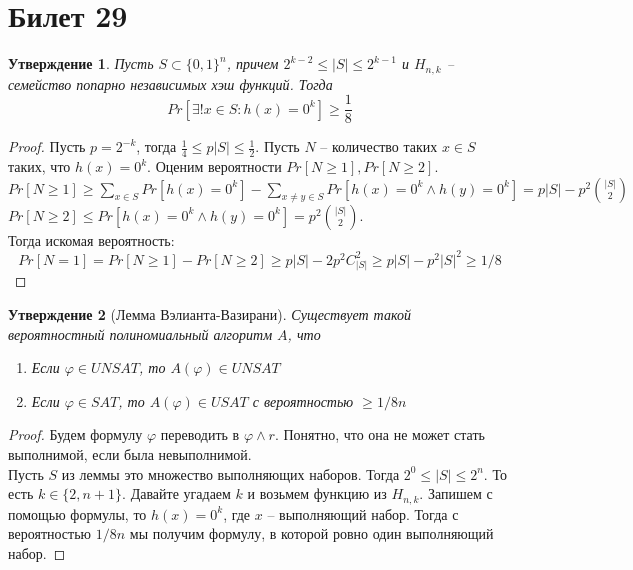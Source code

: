 \documentclass[12pt, letterpaper]{article}
\newtheorem{prop}{Утверждение}[section]
\newcommand{\ph}{\varphi}
\begin{document}
\section{Билет 29}
\begin{prop}
Пусть $S \subset \{0,1\}^n$, причем $2^{k-2} \leq |S| \leq 2^{k-1}$ и $H_{n,k}$ -- семейство попарно независимых хэш функций. Тогда
$$
Pr[\exists ! x \in S: h(x)=0^k] \geq \frac{1}{8}
$$
\end{prop}
\begin{proof}
Пусть $p=2^{-k}$, тогда $\frac1{4} \leq p|S| \leq \frac1{2}$. Пусть $N$ -- количество таких $x\in S$ таких, что $h(x)=0^k$. Оценим вероятности $Pr[N \geq 1], Pr[N \geq 2]$.\\
$Pr[N \geq 1] \geq \sum_{x \in S} Pr[h(x)=0^k] - \sum_{x \neq y \in S} Pr[h(x)=0^k \wedge h(y)=0^k] = p|S|-p^2 \binom{|S|}{2}$\\
$Pr[N \geq 2] \leq Pr[h(x)=0^k \wedge h(y)=0^k] = p^2 \binom{|S|}{2}$.\\
Тогда искомая вероятность: $$Pr[N=1]=Pr[N \geq 1] - Pr[N \geq 2] \geq p|S| - 2p^2 C_{|S|}^2 \geq p|S| - p^2|S|^2 \geq 1/8$$
\end{proof}

\begin{prop}[Лемма Вэлианта-Вазирани]
Существует такой вероятностный полиномиальный алгоритм $A$, что
\begin{enumerate}
\item Если $\ph \in UNSAT$, то $A(\ph) \in UNSAT$ 
\item Если $\ph \in SAT$, то $A(\ph) \in USAT$ с вероятностью $\geq 1/8n$
\end{enumerate} 
\end{prop}
\begin{proof}
Будем формулу $\ph$ переводить в $\ph \wedge r$. Понятно, что она не может стать выполнимой, если была невыполнимой.\\
Пусть $S$ из леммы это множество выполняющих наборов. Тогда $2^0 \leq |S| \leq 2^n$. То есть $ k \in \{2, n + 1 \}$. Давайте угадаем $k$ и возьмем функцию из $H_{n,k}$. Запишем с помощью формулы, то $h(x)=0^k$, где $x$ -- выполняющий набор. Тогда с вероятностью $1/8n$ мы получим формулу, в которой ровно один выполняющий набор.
\end{proof}
\end{document}
